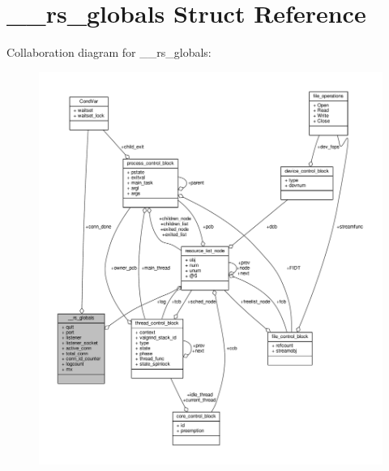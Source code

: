 \hypertarget{struct____rs__globals}{\section{\-\_\-\-\_\-rs\-\_\-globals Struct Reference}
\label{struct____rs__globals}
}


Collaboration diagram for \-\_\-\-\_\-rs\-\_\-globals\-:
\nopagebreak
\begin{figure}[H]
\begin{center}
\leavevmode
\includegraphics[width=350pt]{struct____rs__globals__coll__graph}
\end{center}
\end{figure}

